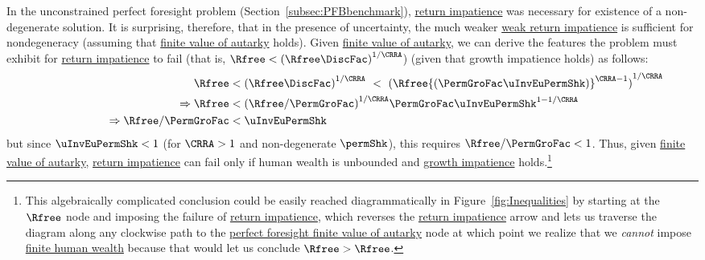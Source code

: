 \documentclass[BufferStockTheory]{subfiles}
\begin{document}
In the unconstrained perfect foresight problem (Section~\ref{subsec:PFBbenchmark}), \hyperlink{RIC}{return impatience} was necessary for existence of a non-degenerate solution.
It is surprising, therefore, that in the presence of uncertainty, the much weaker \hyperlink{WRIC}{weak return impatience} is sufficient for nondegeneracy (assuming that \hyperlink{FVAC}{finite value of autarky}  holds).
Given \hyperlink{FVAC}{finite value of autarky}, we can derive the features the problem must exhibit for \hyperlink{RIC}{return impatience} to fail (that is, $\Rfree < {(\Rfree \DiscFac)}^{1/\CRRA}$) (given that growth impatience holds) as follows:
%
\begin{equation}\label{eq:RICimplies}
  \begin{split}
    \Rfree   & < {(\Rfree \DiscFac)}^{1/\CRRA} ~ < ~ {(\Rfree {(\PermGroFac \uInvEuPermShk)}^{\CRRA-1})}^{1/\CRRA}
    \\ \Rightarrow \Rfree   & < {(\Rfree/\PermGroFac)}^{1/\CRRA}\PermGroFac \uInvEuPermShk^{1-1/\CRRA}
    \\  \qquad\qquad\qquad \Rightarrow  \Rfree/\PermGroFac  & < \uInvEuPermShk
  \end{split}
\end{equation}
%
but since $\uInvEuPermShk < 1$ (for $\CRRA>1$ and non-degenerate $\permShk$), this requires $\Rfree/\PermGroFac < 1$.
Thus, given \hyperlink{FVAC}{finite value of autarky}, \hyperlink{RIC}{return impatience} can fail only if human wealth is unbounded and \hyperlink{GIC}{growth impatience} holds.\footnote{This algebraically complicated conclusion could be easily reached diagrammatically in Figure~\ref{fig:Inequalities} by starting at the $\Rfree$ node and imposing the failure of \hyperlink{RIC}{return impatience}, which reverses the \hyperlink{RIC}{return impatience} arrow and lets us traverse the diagram along any clockwise path to the \hyperlink{PFFVAC}{perfect foresight finite value of autarky} node at which point we realize that we \textit{cannot} impose \hyperlink{FHWC}{finite human wealth} because that would let us conclude $\Rfree > \Rfree$.}
\end{document}
